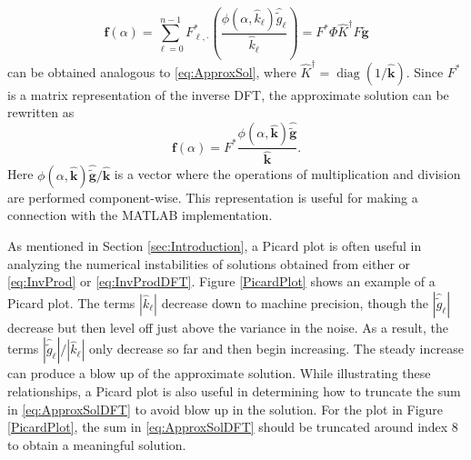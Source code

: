 \documentclass[12pt]{article}
\newcommand{\gnoise}{\widetilde{g}}	%
\newcommand{\gnoiseVec}{\widetilde{\mathbf{g}}}	%
\newcommand{\kVec}{\mathbf{k}}	%
\newcommand{\kMat}{K}	%
\newcommand{\fVec}{\mathbf{f}}	%
\newcommand{\ctrans}{*}	%
\DeclareMathOperator{\diag}{diag}	%
\newcommand{\regparam}{\alpha}
\newcommand{\filt}{\phi}
\begin{document}
\begin{equation}
\fVec(\regparam) = \sum_{\ell = 0}^{n-1} F^\ctrans_{\ell,\cdot}\left(\frac{\filt(\regparam,\widehat{k}_\ell)\widehat{\gnoise}_\ell}{\widehat{k}_\ell}\right) = F^\ctrans\Phi\widehat{\kMat}^\dagger F\gnoiseVec
\label{eq:ApproxSolDFT}
\end{equation}
can be obtained analogous to \eqref{eq:ApproxSol}, where $\widehat{\kMat}^\dagger = \diag(1/\widehat{\kVec})$.
Since $F^\ctrans$ is a matrix representation of the inverse DFT, the approximate solution can be rewritten as
\[\fVec(\regparam) = F^\ctrans \frac{\filt(\regparam,\widehat{\kVec})\widehat{\gnoiseVec}}{\widehat{\kVec}}.\]
Here $\filt(\regparam,\widehat{\kVec})\widehat{\gnoiseVec}/{\widehat{\kVec}}$ is a vector where the operations of multiplication and division are performed component-wise. This representation is useful for making a connection with the MATLAB implementation. \par
As mentioned in Section \ref{sec:Introduction}, a Picard plot is often useful in analyzing the numerical instabilities of solutions obtained from either or \eqref{eq:InvProd} or \eqref{eq:InvProdDFT}. Figure \ref{PicardPlot} shows an example of a Picard plot. The terms $|\widehat{k}_\ell|$ decrease down to machine precision, though the $|\widehat{\gnoise}_\ell|$ decrease but then level off just above the variance in the noise. As a result, the terms $|\widehat{\gnoise}_\ell|/|\widehat{k}_\ell|$ only decrease so far and then begin increasing. The steady increase can produce a blow up of the approximate solution. While illustrating these relationships, a Picard plot is also useful in determining how to truncate the sum in \eqref{eq:ApproxSolDFT} to avoid blow up in the solution. For the plot in Figure \ref{PicardPlot}, the sum in \eqref{eq:ApproxSolDFT} should be truncated around index 8 to obtain a meaningful solution. \par 
\end{document}
